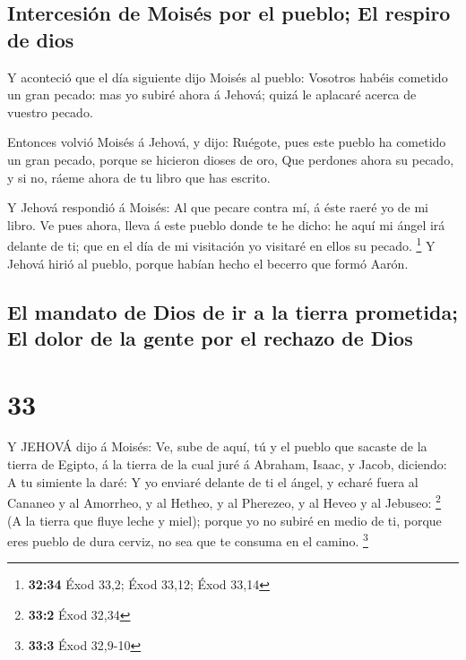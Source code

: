 \hypertarget{intercesiuxf3n-de-moisuxe9s-por-el-pueblo-el-respiro-de-dios}{%
\subsection{Intercesión de Moisés por el pueblo; El respiro de
dios}\label{intercesiuxf3n-de-moisuxe9s-por-el-pueblo-el-respiro-de-dios}}

 Y aconteció que el día siguiente dijo Moisés al pueblo:
Vosotros habéis cometido un gran pecado: mas yo subiré ahora á Jehová;
quizá le aplacaré acerca de vuestro pecado.

 Entonces volvió Moisés á Jehová, y dijo: Ruégote, pues
este pueblo ha cometido un gran pecado, porque se hicieron dioses de
oro,  Que perdones ahora su pecado, y si no, ráeme ahora de
tu libro que has escrito.

 Y Jehová respondió á Moisés: Al que pecare contra mí, á
éste raeré yo de mi libro.  Ve pues ahora, lleva á este
pueblo donde te he dicho: he aquí mi ángel irá delante de ti; que en el
día de mi visitación yo visitaré en ellos su pecado. \footnote{\textbf{32:34}
  Éxod 33,2; Éxod 33,12; Éxod 33,14}  Y Jehová hirió al
pueblo, porque habían hecho el becerro que formó Aarón.

\hypertarget{el-mandato-de-dios-de-ir-a-la-tierra-prometida-el-dolor-de-la-gente-por-el-rechazo-de-dios}{%
\subsection{El mandato de Dios de ir a la tierra prometida; El dolor de
la gente por el rechazo de
Dios}\label{el-mandato-de-dios-de-ir-a-la-tierra-prometida-el-dolor-de-la-gente-por-el-rechazo-de-dios}}

\hypertarget{section-32}{%
\section{33}\label{section-32}}

 Y JEHOVÁ dijo á Moisés: Ve, sube de aquí, tú y el pueblo
que sacaste de la tierra de Egipto, á la tierra de la cual juré á
Abraham, Isaac, y Jacob, diciendo: A tu simiente la daré:  Y
yo enviaré delante de ti el ángel, y echaré fuera al Cananeo y al
Amorrheo, y al Hetheo, y al Pherezeo, y al Heveo y al Jebuseo:
\footnote{\textbf{33:2} Éxod 32,34}  (A la tierra que fluye
leche y miel); porque yo no subiré en medio de ti, porque eres pueblo de
dura cerviz, no sea que te consuma en el camino. \footnote{\textbf{33:3}
  Éxod 32,9-10}

